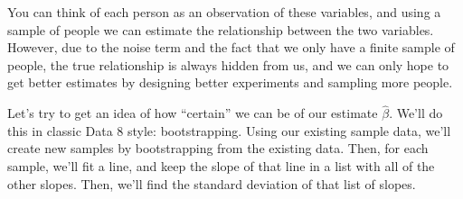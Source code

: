 \documentclass[letterpaper,10pt,english]{jupyterBook}
\begin{document}
\sphinxAtStartPar
You can think of each person as an observation of these variables, and using a sample of people we can estimate the relationship between the two variables. However, due to the noise term and the fact that we only have a finite sample of people, the true relationship is always hidden from us, and we can only hope to get better estimates by designing better experiments and sampling more people.

\sphinxAtStartPar
Let’s try to get an idea of how “certain” we can be of our estimate \(\hat{\beta}\). We’ll do this in classic Data 8 style: bootstrapping. Using our existing sample data, we’ll create new samples by bootstrapping from the existing data. Then, for each sample, we’ll fit a line, and keep the slope of that line in a list with all of the other slopes. Then, we’ll find the standard deviation of that list of slopes.

\begin{sphinxVerbatim}[commandchars=\\\{\}]
  
   

   
      
      
      
       
       \PYG{p}{[}\PYG{p}{]} 
    
     
 
\end{sphinxVerbatim}
\end{document}
